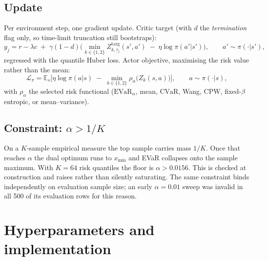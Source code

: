 \documentclass[11pt,a4paper]{article}
\newcommand{\evar}{\mathrm{EVaR}}
\newcommand{\cvar}{\mathrm{CVaR}}
\begin{document}
\subsection{Update}

Per environment step, one gradient update. Critic target (with $d$ the
\emph{termination} flag only, so time-limit truncation still bootstraps):
\begin{equation}
y_j = r - \lambda c \;+\; \gamma (1-d)\Big(\min_{k\in\{1,2\}} Z^{\text{targ}}_{k,\tau_j}(s',a')
      \;-\; \eta \log \pi(a'|s')\Big), \qquad a' \sim \pi(\cdot|s'),
\end{equation}
regressed with the quantile Huber loss. Actor objective, maximising the risk value
rather than the mean:
\begin{equation}
\mathcal{L}_\pi = \mathbb{E}_s\Big[\eta \log\pi(a|s) \;-\;
  \min_{k\in\{1,2\}} \rho_\alpha\big(Z_k(s,a)\big)\Big], \qquad a \sim \pi(\cdot|s),
\end{equation}
with $\rho_\alpha$ the selected risk functional ($\evar_\alpha$, mean, $\cvar$,
Wang, CPW, fixed-$\beta$ entropic, or mean--variance).

\subsection{Constraint: $\alpha > 1/K$}

On a $K$-sample empirical measure the top sample carries mass $1/K$. Once that
reaches $\alpha$ the dual optimum runs to $x_{\min}$ and EVaR collapses onto the
sample maximum. With $K = 64$ risk quantiles the floor is $\alpha > 0.0156$. This
is checked at construction and raises rather than silently saturating. The same
constraint binds independently on evaluation sample size; an early $\alpha = 0.01$
sweep was invalid in all 500 of its evaluation rows for this reason.

\section{Hyperparameters and implementation}
\end{document}
